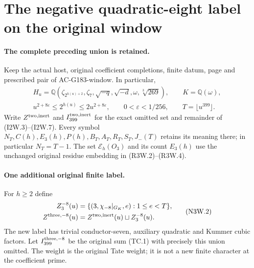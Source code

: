 \section{The negative quadratic-eight label on the original window}
\label{sec:coefficient-three-negative8-window}

\paragraph{The complete preceding union is retained.}
Keep the actual host, original coefficient completions, finite datum,
page and prescribed pair of AC-G183-window. In particular,
\[
 \begin{gathered}
 H_u=\mathbb Q(\zeta_{2^{h(u)+2}},\zeta_7,
       \sqrt{-q},\sqrt{-d},\omega,\sqrt[3]{269}),
       \qquad K=\mathbb Q(\omega),\\
 u^{2+8\varepsilon}\leq2^{h(u)}\leq2u^{2+8\varepsilon},
 \qquad0<\varepsilon<1/256,
 \qquad T=\lfloor u^{399}\rfloor.
 \end{gathered}\tag{N3W.1}
\]
Write $Z^{\rm two,inert}$ and $I_{399}^{\rm two,inert}$ for the
exact omitted set and remainder of (I2W.3)--(I2W.7).
Every symbol $N_T,C(h),E_3(h),P(h),B_T,A_T,R_T,S_T,J_-(T)$
retains its meaning there; in particular $N_T=T-1$.
The set $\mathscr E_h(O_3)$ and its count $E_3(h)$ use the
unchanged original residue embedding in (R3W.2)--(R3W.4).

\paragraph{One additional original finite label.}
For $h\geq2$ define
\[
 \begin{aligned}
 Z^{-8}_3(u)&=
       \{(3,\chi_{-8}|_{G_K},e):1\leq e<T\},\\
 Z^{\rm three,-8}(u)&=
                  Z^{\rm two,inert}(u)\sqcup Z^{-8}_3(u).
 \end{aligned}\tag{N3W.2}
\]
The new label has trivial conductor-seven, auxiliary quadratic
and Kummer cubic factors. Let $I_{399}^{\rm three,-8}$ be the
original sum (TC.1) with precisely this union omitted.
The weight is the original Tate weight; it is not a new finite
character at the coefficient prime.

